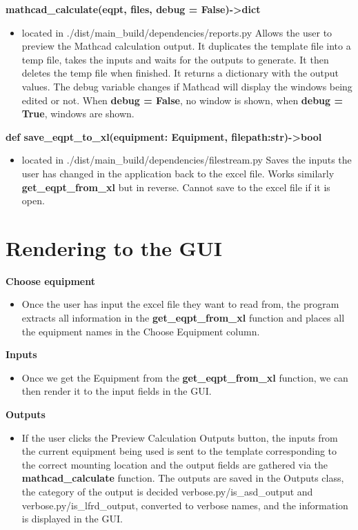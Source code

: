 \documentclass[11pt]{article}
\begin{document}
\textbf{mathcad\_calculate(eqpt, files, debug = False)->dict}
\begin{itemize}
\item located in ./dist/main\_build/dependencies/reports.py
Allows the user to preview the Mathcad calculation output. It duplicates the template file into a temp file, takes the inputs and waits for the outputs to generate. It then deletes the temp file when finished. It returns a dictionary with the output values. The debug variable changes if Mathcad will display the windows being edited or not. When \textbf{debug = False}, no window is shown, when \textbf{debug = True}, windows are shown.
\end{itemize}

\textbf{def save\_eqpt\_to\_xl(equipment: Equipment, filepath:str)->bool}
\begin{itemize}
\item located in ./dist/main\_build/dependencies/filestream.py
Saves the inputs the user has changed in the application back to the excel file. Works similarly \textbf{get\_eqpt\_from\_xl} but in reverse. Cannot save to the excel file if it is open.
\end{itemize}

\section{Rendering to the GUI}
\label{sec:orgbf5d053}
\textbf{Choose equipment}
\begin{itemize}
\item Once the user has input the excel file they want to read from, the program extracts all information in the \textbf{get\_eqpt\_from\_xl} function and places all the equipment names in the Choose Equipment column.
\end{itemize}

\textbf{Inputs}
\begin{itemize}
\item Once we get the Equipment from the \textbf{get\_eqpt\_from\_xl} function, we can then render it to the input fields in the GUI.
\end{itemize}

\textbf{Outputs}
\begin{itemize}
\item If the user clicks the Preview Calculation Outputs button, the inputs from the current equipment being used is sent to the template corresponding to the correct mounting location and the output fields are gathered via the \textbf{mathcad\_calculate} function. The outputs are saved in the Outputs class, the category of the output is decided verbose.py/is\_asd\_output and verbose.py/is\_lfrd\_output, converted to verbose names, and the information is displayed in the GUI.
\end{itemize}
\end{document}
